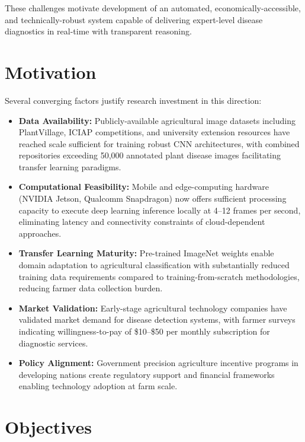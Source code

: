 \documentclass[conference]{IEEEtran}
\begin{document}
These challenges motivate development of an automated, economically-accessible, and technically-robust system capable of delivering expert-level disease diagnostics in real-time with transparent reasoning.

\section{Motivation}

Several converging factors justify research investment in this direction:

\begin{itemize}
\item \textbf{Data Availability:} Publicly-available agricultural image datasets including PlantVillage, ICIAP competitions, and university extension resources have reached scale sufficient for training robust CNN architectures, with combined repositories exceeding 50,000 annotated plant disease images facilitating transfer learning paradigms.

\item \textbf{Computational Feasibility:} Mobile and edge-computing hardware (NVIDIA Jetson, Qualcomm Snapdragon) now offers sufficient processing capacity to execute deep learning inference locally at 4--12 frames per second, eliminating latency and connectivity constraints of cloud-dependent approaches.

\item \textbf{Transfer Learning Maturity:} Pre-trained ImageNet weights enable domain adaptation to agricultural classification with substantially reduced training data requirements compared to training-from-scratch methodologies, reducing farmer data collection burden.

\item \textbf{Market Validation:} Early-stage agricultural technology companies have validated market demand for disease detection systems, with farmer surveys indicating willingness-to-pay of \$10--\$50 per monthly subscription for diagnostic services.

\item \textbf{Policy Alignment:} Government precision agriculture incentive programs in developing nations create regulatory support and financial frameworks enabling technology adoption at farm scale.
\end{itemize}

\section{Objectives}
\end{document}
